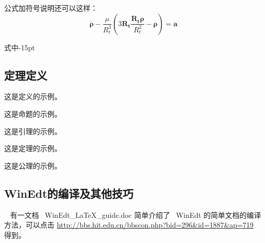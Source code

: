 公式加符号说明还可以这样：
\begin{equation}\label{eq:111}
\ddot{\boldsymbol{\rho}}-\frac{\mu}{R_{t}^{3}}\left( 3\mathbf{R_{t}}\frac{\mathbf{R_{t}\rho}}{R_{t}^{2}}-\boldsymbol{\rho}\right)=\mathbf{a}
\end{equation}
\begin{formulasymb}{式中}{-15pt}%
\end{formulasymb}

\subsection{定理定义}

\begin{definition}
这是定义的示例。
\end{definition}

\begin{proposition}
这是命题的示例。
\end{proposition}

\begin{lemma}
这是引理的示例。
\end{lemma}

\begin{theorem}
这是定理的示例。
\end{theorem}

\begin{axiom}
这是公理的示例。
\end{axiom}

\subsection{WinEdt的编译及其他技巧}
\label{sec:winedttricks}
~
有一文档~ WinEdt\_LaTeX\_guide.doc 简单介绍了~ WinEdt 的简单文档的编译方法，可以点击
\url{http://bbs.hit.edu.cn/bbscon.php?bid=296&id=1887&ap=719} 得到。

